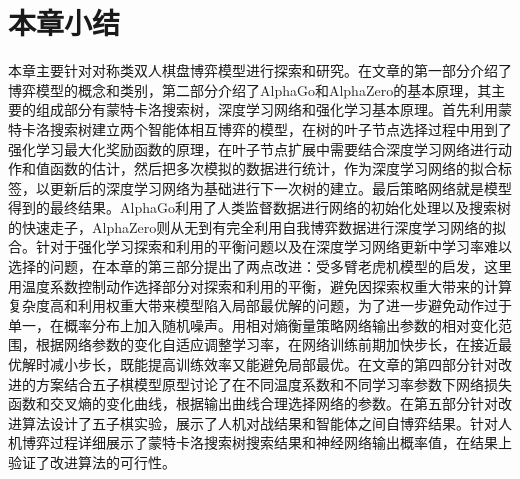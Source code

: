\section{本章小结}
本章主要针对对称类双人棋盘博弈模型进行探索和研究。在文章的第一部分介绍了博弈模型的概念和类别，第二部分介绍了AlphaGo和AlphaZero的基本原理，其主要的组成部分有蒙特卡洛搜索树，深度学习网络和强化学习基本原理。首先利用蒙特卡洛搜索树建立两个智能体相互博弈的模型，在树的叶子节点选择过程中用到了强化学习最大化奖励函数的原理，在叶子节点扩展中需要结合深度学习网络进行动作和值函数的估计，然后把多次模拟的数据进行统计，作为深度学习网络的拟合标签，以更新后的深度学习网络为基础进行下一次树的建立。最后策略网络就是模型得到的最终结果。AlphaGo利用了人类监督数据进行网络的初始化处理以及搜索树的快速走子，AlphaZero则从无到有完全利用自我博弈数据进行深度学习网络的拟合。针对于强化学习探索和利用的平衡问题以及在深度学习网络更新中学习率难以选择的问题，在本章的第三部分提出了两点改进：受多臂老虎机模型的启发，这里用温度系数控制动作选择部分对探索和利用的平衡，避免因探索权重大带来的计算复杂度高和利用权重大带来模型陷入局部最优解的问题，为了进一步避免动作过于单一，在概率分布上加入随机噪声。用相对熵衡量策略网络输出参数的相对变化范围，根据网络参数的变化自适应调整学习率，在网络训练前期加快步长，在接近最优解时减小步长，既能提高训练效率又能避免局部最优。在文章的第四部分针对改进的方案结合五子棋模型原型讨论了在不同温度系数和不同学习率参数下网络损失函数和交叉熵的变化曲线，根据输出曲线合理选择网络的参数。在第五部分针对改进算法设计了五子棋实验，展示了人机对战结果和智能体之间自博弈结果。针对人机博弈过程详细展示了蒙特卡洛搜索树搜索结果和神经网络输出概率值，在结果上验证了改进算法的可行性。
